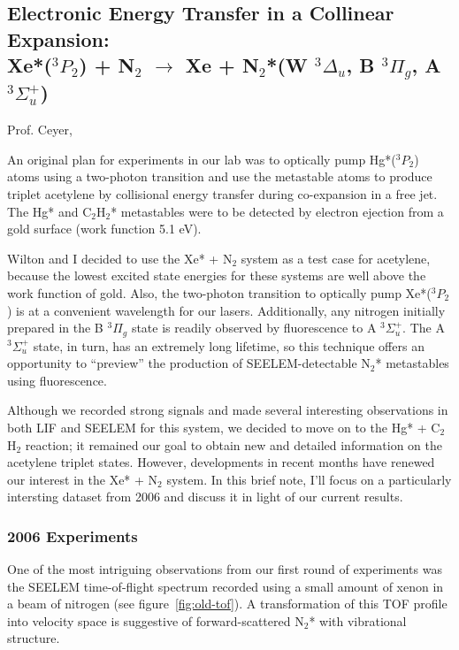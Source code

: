 \documentclass[12pt]{mitthesis}
\begin{document}
\subsection*{Electronic Energy Transfer in a Collinear Expansion:\\
  Xe*($^3P_2$) + N$_2$ $\rightarrow$ Xe + 
  N$_2$*(W $^3\Delta_u$, B $^3\Pi_g$, A $^3\Sigma_u^+$)} 

Prof. Ceyer,

An original plan for experiments in our lab was to optically pump
Hg*($^3P_2$) atoms using a two-photon transition and use the
metastable atoms to produce triplet acetylene by collisional energy
transfer during co-expansion in a free jet.  The Hg* and C$_2$H$_2$*
metastables were to be detected by electron ejection from a gold
surface (work function 5.1 eV).

Wilton and I decided to use the Xe* + N$_2$ system as a test case for
acetylene, because the lowest excited state energies for these systems
are well above the work function of gold.  Also, the two-photon
transition to optically pump Xe*($^3P_2$) is at a convenient
wavelength for our lasers.  Additionally, any nitrogen initially
prepared in the B $^3\Pi_g$ state is readily observed by fluorescence
to A $^3\Sigma_u^+$.  The A $^3\Sigma_u^+$ state, in turn, has an
extremely long lifetime, so this technique offers an opportunity to
``preview'' the production of SEELEM-detectable N$_2$* metastables
using fluorescence.

Although we recorded strong signals and made several interesting
observations in both LIF and SEELEM for this system, we decided to
move on to the Hg* + C$_2$H$_2$ reaction; it remained our goal to
obtain new and detailed information on the acetylene triplet states.
However, developments in recent months have renewed our interest in
the Xe* + N$_2$ system.  In this brief note, I'll focus on a
particularly intersting dataset from 2006 and discuss it in light of
our current results.

\subsubsection*{2006 Experiments}

One of the most intriguing observations from our first round of
experiments was the SEELEM time-of-flight spectrum recorded using a
small amount of xenon in a beam of nitrogen (see
figure~\ref{fig:old-tof}).  A transformation of this TOF profile into
velocity space is suggestive of forward-scattered N$_2$* with
vibrational structure.
\end{document}
